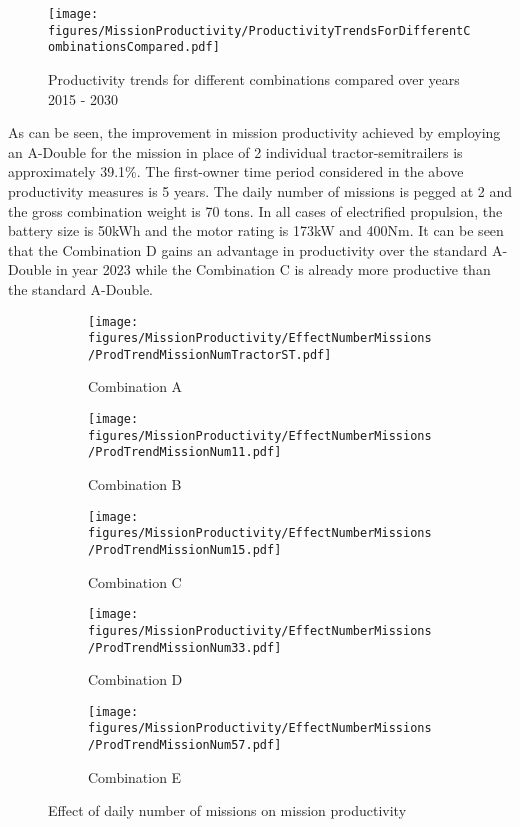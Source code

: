 \documentclass[ExampleMasters.tex]{subfiles}
\begin{document}
	\begin{figure}[ht!]
		\centering
		\texttt{[image: figures/MissionProductivity/ProductivityTrendsForDifferentCombinationsCompared.pdf]}
		\caption{Productivity trends for different combinations compared over years 2015 - 2030}
		\label{ProductivityComb20152030}
	\end{figure}

	As can be seen, the improvement in mission productivity achieved by employing an A-Double for the mission in place of 2 individual tractor-semitrailers is approximately 39.1\%. The first-owner time period considered in the above productivity measures is 5 years. The daily number of missions is pegged at 2 and the gross combination weight is 70 tons. In all cases of electrified propulsion, the battery size is 50kWh and the motor rating is 173kW and 400Nm. It can be seen that the Combination D gains an advantage in productivity over the standard A-Double in year 2023 while the Combination C is already more productive than the standard A-Double.\\

	\begin{figure}
		\begin{subfigure}{.5\textwidth}
			\centering
			\texttt{[image: figures/MissionProductivity/EffectNumberMissions/ProdTrendMissionNumTractorST.pdf]}
			\caption{Combination A}
		\end{subfigure}
		\begin{subfigure}{.5\textwidth}
			\centering
			\texttt{[image: figures/MissionProductivity/EffectNumberMissions/ProdTrendMissionNum11.pdf]}
			\caption{Combination B}
		\end{subfigure}
		\begin{subfigure}{.5\textwidth}
			\centering
			\texttt{[image: figures/MissionProductivity/EffectNumberMissions/ProdTrendMissionNum15.pdf]}
			\caption{Combination C}
		\end{subfigure}
		\begin{subfigure}{.5\textwidth}
			\centering
			\texttt{[image: figures/MissionProductivity/EffectNumberMissions/ProdTrendMissionNum33.pdf]}
			\caption{Combination D}
		\end{subfigure}
		\begin{subfigure}{.5\textwidth}
			\centering
			\texttt{[image: figures/MissionProductivity/EffectNumberMissions/ProdTrendMissionNum57.pdf]}
			\caption{Combination E}
		\end{subfigure}
		\caption{Effect of daily number of missions on mission productivity}
		\label{ProdNumMissions}
	\end{figure} 
\end{document}
